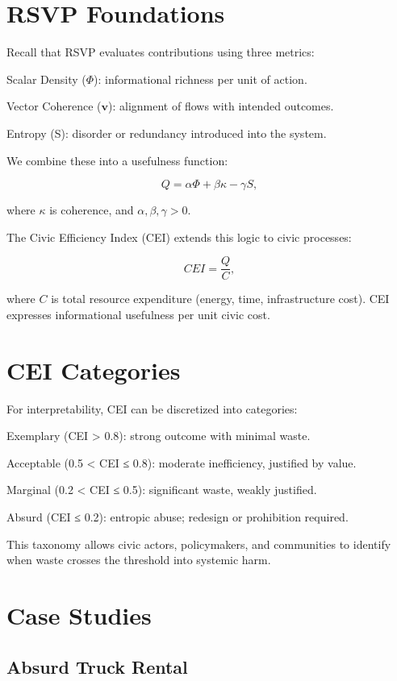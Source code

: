 \documentclass{book}
\begin{document}
\section{RSVP Foundations}

Recall that RSVP evaluates contributions using three metrics:

Scalar Density (\(\Phi\)): informational richness per unit of action.

Vector Coherence (\(\mathbf{v}\)): alignment of flows with intended outcomes.

Entropy (S): disorder or redundancy introduced into the system.

We combine these into a usefulness function:

\[ Q = \alpha \Phi + \beta \kappa - \gamma S, \]

where \( \kappa \) is coherence, and \( \alpha, \beta, \gamma > 0 \).

The Civic Efficiency Index (CEI) extends this logic to civic processes:

\[ CEI = \frac{Q}{C}, \]

where \( C \) is total resource expenditure (energy, time, infrastructure cost). CEI expresses informational usefulness per unit civic cost.

\section{CEI Categories}

For interpretability, CEI can be discretized into categories:

Exemplary (CEI > 0.8): strong outcome with minimal waste.

Acceptable (0.5 < CEI ≤ 0.8): moderate inefficiency, justified by value.

Marginal (0.2 < CEI ≤ 0.5): significant waste, weakly justified.

Absurd (CEI ≤ 0.2): entropic abuse; redesign or prohibition required.

This taxonomy allows civic actors, policymakers, and communities to identify when waste crosses the threshold into systemic harm.

\section{Case Studies}

\subsection{Absurd Truck Rental}
\end{document}
